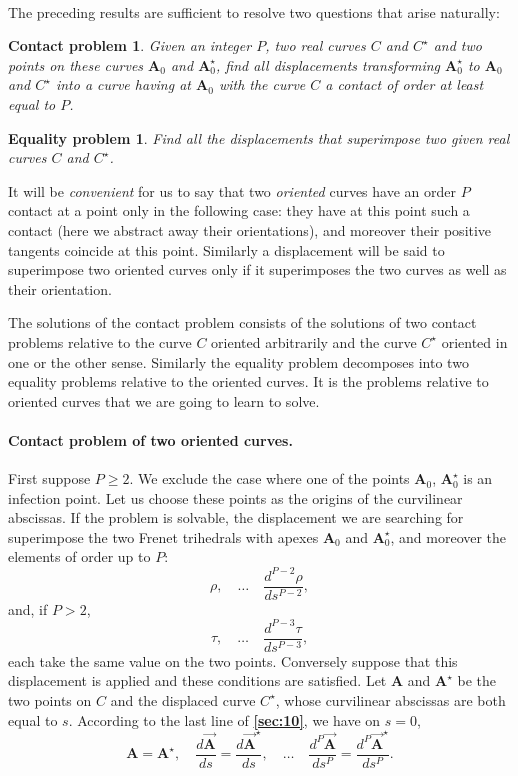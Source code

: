 \documentclass[leqno,11pt]{book}
\numberwithin{equation}{chapter}
\theoremstyle{shape1}
\theoremstyle{shapesmall}
\newcommand{\fsref}[1]{{\rm\textsection\textbf{\ref{sec:#1}}}}
\newcommand{\rvec}[1]{\vec{\mathbf{#1}}}
\begin{document}
\paragraph{}
\label{sec:11}
The preceding results are sufficient to resolve two questions that arise naturally:
\newtheorem*{pcont}{Contact problem}
\begin{pcont}
  Given an integer $P$, two real curves $C$ and $C^{\star}$ and two points on these curves $\mathbf{A}_{0}$ and $\mathbf{A}^{\star}_{0}$, find all displacements transforming $\mathbf{A}_{0}^{\star}$ to $\mathbf{A}_{0}$ and $C^{\star}$ into a curve having at $\mathbf{A}_{0}$ with the curve $C$ a contact of order at least equal to $P$.
\end{pcont}

\newtheorem*{pequ}{Equality problem}
\begin{pequ}
  Find all the displacements that superimpose two given real curves $C$ and $C^{\star}$.
\end{pequ}

It will be \emph{convenient} for us to say that two \emph{oriented} curves have an order $P$ contact at a point only in the following case: they have at this point such a contact (here we abstract away their orientations), and moreover their positive tangents coincide at this point. Similarly a displacement will be said to superimpose two oriented curves only if it superimposes the two curves as well as their orientation.

The solutions of the contact problem consists of the solutions of two contact problems relative to the curve $C$ oriented arbitrarily and the curve $C^{\star}$ oriented in one or the other sense. Similarly the equality problem decomposes into two equality problems relative to the oriented curves. It is the problems relative to oriented curves that we are going to learn to solve.

\paragraph{Contact problem of two oriented curves.}
\label{sec:12}
First suppose $P\ge 2$. We exclude the case where one of the points $\mathbf{A}_{0}$, $\mathbf{A}_{0}^{\star}$ is an infection point. Let us choose these points as the origins of the curvilinear abscissas. If the problem is solvable, the displacement we are searching for superimpose the two Frenet trihedrals with apexes $\mathbf{A}_{0}$ and $\mathbf{A}_{0}^{\star}$, and moreover the elements of order up to $P$:
\[
\rho,\quad\dots\quad\frac{d^{P-2}\rho}{ds^{P-2}},
\]
and, if $P>2$,
\[
\tau,\quad\dots\quad\frac{d^{P-3}\tau}{ds^{P-3}},
\]
each take the same value on the two points. Conversely suppose that this displacement is applied and these conditions are satisfied. Let $\mathbf{A}$ and $\mathbf{A}^{\star}$ be the two points on $C$ and the displaced curve $C^{\star}$, whose curvilinear abscissas are both equal to $s$. According to the last line of \fsref{10}, we have on $s=0$,
\[
\mathbf{A}=\mathbf{A}^{\star},\quad\frac{d{\rvec{A}}}{ds}=\frac{d{\rvec{A}}^{\star}}{ds},\quad\dots\quad\frac{d^{P}{\rvec{A}}}{ds^{P}}=\frac{d^{P}{\rvec{A}}^{\star}}{ds^{P}}.
\]
\end{document}
